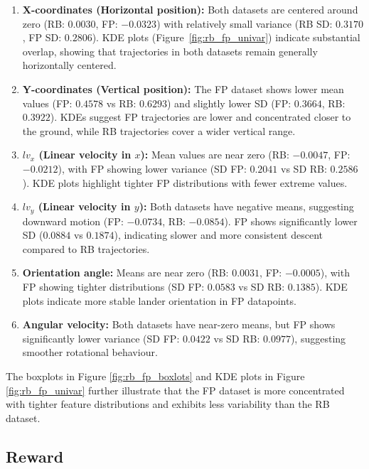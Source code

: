 \begin{enumerate}[label=\textbullet]
    \item \textbf{X-coordinates (Horizontal position):} Both datasets are centered around zero (RB: $0.0030$, FP: $-0.0323$) with relatively small variance (RB SD: $0.3170$, FP SD: $0.2806$). KDE plots (Figure~\ref{fig:rb_fp_univar}) indicate substantial overlap, showing that trajectories in both datasets remain generally horizontally centered.

    \item \textbf{Y-coordinates (Vertical position):} The FP dataset shows lower mean values (FP: $0.4578$ vs RB: $0.6293$) and slightly lower SD (FP: $0.3664$, RB: $0.3922$). KDEs suggest FP trajectories are lower and concentrated closer to the ground, while RB trajectories cover a wider vertical range.

    \item \textbf{$lv_x$ (Linear velocity in $x$):} Mean values are near zero (RB: $-0.0047$, FP: $-0.0212$), with FP showing lower variance (SD FP: $0.2041$ vs SD RB: $0.2586$). KDE plots highlight tighter FP distributions with fewer extreme values.

    \item \textbf{$lv_y$ (Linear velocity in $y$):} Both datasets have negative means, suggesting downward motion (FP: $-0.0734$, RB: $-0.0854$). FP shows significantly lower SD ($0.0884$ vs $0.1874$), indicating slower and more consistent descent compared to RB trajectories.

    \item \textbf{Orientation angle:} Means are near zero (RB: $0.0031$, FP: $-0.0005$), with FP showing tighter distributions (SD FP: $0.0583$ vs SD RB: $0.1385$). KDE plots indicate more stable lander orientation in FP datapoints.

    \item \textbf{Angular velocity:} Both datasets have near-zero means, but FP shows significantly lower variance (SD FP: $0.0422$ vs SD RB: $0.0977$), suggesting smoother rotational behaviour.
\end{enumerate}



The boxplots in Figure \ref{fig:rb_fp_boxlots} and KDE plots in Figure \ref{fig:rb_fp_univar} further illustrate that the FP dataset is more concentrated with tighter feature distributions and exhibits less variability than the RB dataset.

\subsection{Reward}

